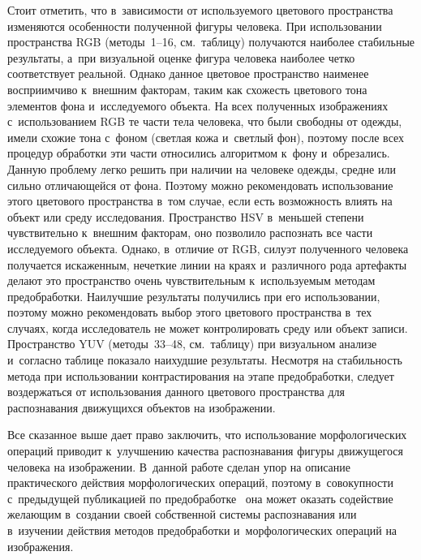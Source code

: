 \begin{multicols}{2}
  Стоит отметить, что в~зависимости от используемого цветового пространства
изменяются особенности полученной фигуры человека. При использовании
пространства RGB (методы~1--16, см.\ таблицу) получаются наиболее
стабильные результаты, а~при визуальной оценке фигура человека наиболее
четко соответствует реальной. Однако данное цветовое пространство наименее
восприимчиво к~внешним факторам, таким как схожесть цветового тона
элементов фона и~исследуемого объекта. На всех полученных изображениях с~использованием RGB те части тела человека, что были свободны от одежды,
имели схожие тона с~фоном (светлая кожа и~светлый фон), поэтому после всех
процедур обработки эти части относились алгоритмом к~фону и~обрезались.
Данную проблему легко решить при наличии на человеке одежды, средне или
сильно отличающейся от фона. Поэтому можно рекомендовать использование
этого цветового пространства в~том случае, если есть возможность влиять на
объект или среду исследования. Пространство HSV в~меньшей степени
чувствительно к~внешним факторам, оно позволило распознать все части
исследуемого объекта. Однако, в~отличие от RGB, силуэт полученного человека
получается искаженным, нечеткие линии на краях и~различного рода артефакты
делают это пространство очень чувствительным к~используемым методам
предобработки. Наилучшие результаты получились при его использовании,
поэтому можно рекомендовать выбор этого цветового пространства в~тех
случаях, когда исследователь не может контролировать среду или объект
записи. Пространство YUV (методы~33--48, см.\ таблицу) при визуальном
анализе и~согласно таблице показало наихудшие результаты. Несмотря на
стабильность метода при использовании контрастирования на этапе
предобработки, следует воздержаться от использования данного цветового
пространства для распознавания движущихся объектов на изображении.

  Все сказанное выше дает право заключить, что использование
морфологических операций приводит к~улучшению качества распознавания
фигуры движущегося человека на изображении. В~данной работе сделан упор
на описание практического действия морфологических операций, поэтому в~совокупности с~предыдущей публикацией по предобработке~\cite{9-ab} она
может оказать содействие желающим в~создании своей собственной системы
распознавания или в~изучении действия методов предобработки и~морфологических операций на изображения.

\vspace*{-6pt}

{\small\frenchspacing
 {%
 \begin{thebibliography}{99}
 

\end{thebibliography}}}
\end{multicols}

